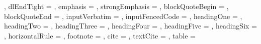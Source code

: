 {{    },
  dlEndTight = {%
    },
  emphasis = {%
    },
  strongEmphasis = {%
    },
  blockQuoteBegin = {%
    },
  blockQuoteEnd = {%
    },
  inputVerbatim = {%
    },
  inputFencedCode = {%
    },
  headingOne = {%
    },
  headingTwo = {%
    },
  headingThree = {%
    },
  headingFour = {%
    },
  headingFive = {%
    },
  headingSix = {%
    },
  horizontalRule = {%
    },
  footnote = {%
    },
  cite = {%
    },
  textCite = {%
    },
  table = {%
    }
}
